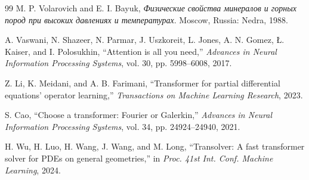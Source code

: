 \begin{thebibliography}{99}
M. P. Volarovich and E. I. Bayuk,
\textit{Физические свойства минералов и горных пород при высоких давлениях и температурах}.
Moscow, Russia: Nedra, 1988.

A. Vaswani, N. Shazeer, N. Parmar, J. Uszkoreit, L. Jones, A. N. Gomez, \L. Kaiser, and I. Polosukhin,
``Attention is all you need,''
\textit{Advances in Neural Information Processing Systems}, vol. 30, pp. 5998--6008, 2017.

Z. Li, K. Meidani, and A. B. Farimani,
``Transformer for partial differential equations' operator learning,''
\textit{Transactions on Machine Learning Research}, 2023.

S. Cao,
``Choose a transformer: Fourier or Galerkin,''
\textit{Advances in Neural Information Processing Systems}, vol. 34, pp. 24924--24940, 2021.

H. Wu, H. Luo, H. Wang, J. Wang, and M. Long,
``Transolver: A fast transformer solver for PDEs on general geometries,''
in \textit{Proc. 41st Int. Conf. Machine Learning}, 2024.

\end{thebibliography}
